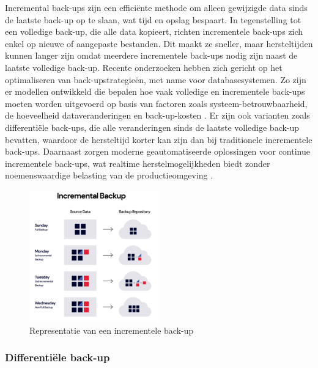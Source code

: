 Incremental back-ups zijn een efficiënte methode om alleen gewijzigde data sinds de laatste back-up op te slaan, wat tijd en opslag bespaart. In tegenstelling tot een volledige back-up, die alle data kopieert, richten incrementele back-ups zich enkel op nieuwe of aangepaste bestanden. Dit maakt ze sneller, maar hersteltijden kunnen langer zijn omdat meerdere incrementele back-ups nodig zijn naast de laatste volledige back-up. Recente onderzoeken hebben zich gericht op het optimaliseren van back-upstrategieën, met name voor databasesystemen. Zo zijn er modellen ontwikkeld die bepalen hoe vaak volledige en incrementele back-ups moeten worden uitgevoerd op basis van factoren zoals systeem-betrouwbaarheid, de hoeveelheid dataveranderingen en back-up-kosten \autocite{Zhao2024}. Er zijn ook varianten zoals differentiële back-ups, die alle veranderingen sinds de laatste volledige back-up bevatten, waardoor de hersteltijd korter kan zijn dan bij traditionele incrementele back-ups. Daarnaast zorgen moderne geautomatiseerde oplossingen voor continue incrementele back-ups, wat realtime herstelmogelijkheden biedt zonder noemenswaardige belasting van de productieomgeving \autocite{Qian2010}.
\begin{figure}[h] 
    \centering
    \includegraphics[width=0.5\textwidth]{img/incrementb.png}  
    \caption{Representatie van een incrementele back-up \autocite{Rivas2022}}   
    \label{fig:incrback-up}           
\end{figure}


\subsubsection{Differentiële back-up}

